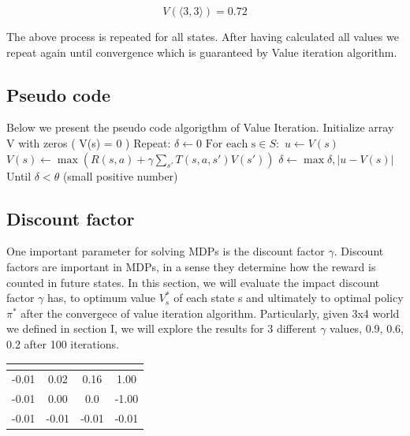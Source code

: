 \documentclass[10pt,a4paper,twocolumn]{article}
\newcommand\tab[1][0.25cm]{\hspace*{#1}}
\begin{document}
	\begin{equation}
	 V(\big \langle 3,3 \big \rangle) = 0.72
	\end{equation}


	The above process is repeated for all states. After having calculated all values we repeat again until convergence which is guaranteed by Value iteration algorithm.
	\subsection{Pseudo code}
	Below we present the pseudo code algorigthm of Value Iteration.
	\newline
	Initialize array V with zeros ( V(s) = 0 )
	\newline
	Repeat:
	\newline
	\tab $\delta \leftarrow 0$
	\newline
	\tab  $\text{For each s} \in S:$
	\newline
	\tab  \tab  $u \leftarrow V(s)$
	\newline
	\tab  \tab  $V(s) \leftarrow \max{ ( R(s,a) + \gamma \sum_{s'}T(s,a,s')V(s') )}$
	\newline
	\tab  \tab  $\delta \leftarrow \max{\delta, | u - V(s)|}$
	\newline
	Until $\delta < \theta$ (small positive number)
	
	
	\subsection{Discount factor}
	 One  important parameter for solving  MDPs is the discount factor $\gamma$. Discount factors are important in MDPs, in a sense they determine how the reward is counted in future states.
	 In this section, we will evaluate the impact discount factor $\gamma$ has, to optimum value $V_{s}^{*}$ of each state s and ultimately to optimal policy $\pi^{*} $ after the convergece of value iteration algorithm. Particularly, given 3x4 world we defined in section I, we will explore the results for 3 different $\gamma$ values, 0.9, 0.6, 0.2 after 100 iterations.
	 
	 	\begin{center}
	 	\begin{tabular}{ c c c c}
	 		\hline
	 		\multicolumn{4}{|c|}{  \text{$\gamma = 0.2$} } \\
	 		\hline
	 		-0.01  & 0.02  & 0.16 & 1.00 \\ 
	 		-0.01  & 0.00  & 0.0  & -1.00 \\  
	 		-0.01 & -0.01 &  -0.01 & -0.01
	 	\end{tabular}
	 \end{center}
	
\end{document}

